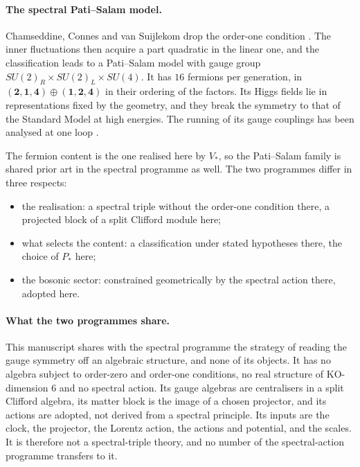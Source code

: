 \paragraph{The spectral Pati--Salam model.} Chamseddine, Connes and van Suijlekom drop the order-one condition
\cite{ChamseddineConnesVanSuijlekom13a,ChamseddineConnesVanSuijlekom13}. The inner fluctuations then acquire a part quadratic in the linear
one, and the classification leads to a Pati--Salam model with gauge group $SU(2)_R\times SU(2)_L\times SU(4)$. It has $16$ fermions per
generation, in $(\mathbf2,\mathbf1,\mathbf4)\oplus(\mathbf1,\mathbf2,\mathbf4)$ in their ordering of the factors. Its Higgs fields lie in
representations fixed by the geometry, and they break the symmetry to that of the Standard Model at high energies. The running of its gauge
couplings has been analysed at one loop \cite{ChamseddineConnesVanSuijlekom15}.

The fermion content is the one realised here by $V_*$, so the Pati--Salam family is shared prior art in the spectral programme as well. The
two programmes differ in three respects:
\begin{itemize}
\item the realisation: a spectral triple without the order-one condition there, a projected block of a split Clifford module here;
\item what selects the content: a classification under stated hypotheses there, the choice of $P_*$ here;
\item the bosonic sector: constrained geometrically by the spectral action there, adopted here.
\end{itemize}

\paragraph{What the two programmes share.} This manuscript shares with the spectral programme the strategy of reading the gauge symmetry off an
algebraic structure, and none of its objects. It has no algebra subject to order-zero and order-one conditions, no real structure of
KO-dimension $6$ and no spectral action. Its gauge algebras are centralisers in a split Clifford algebra, its matter block is the image of a
chosen projector, and its actions are adopted, not derived from a spectral principle. Its inputs are the clock, the projector, the Lorentz
action, the actions and potential, and the scales. It is therefore not a spectral-triple theory, and no number of the spectral-action
programme transfers to it.

